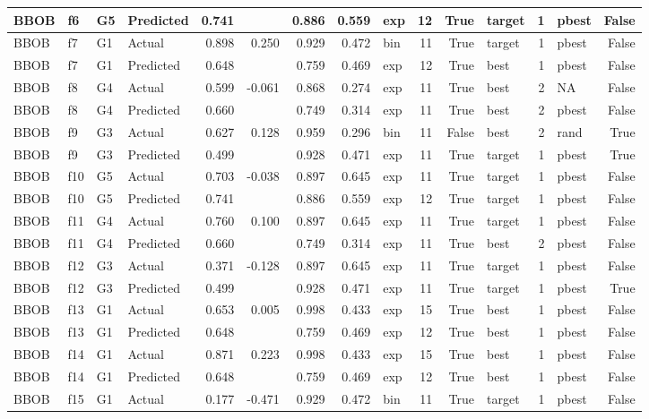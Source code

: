 \begin{table}[htbp]
{\begin{tabular}{llllrrrrlrrlrlr}
BBOB & f6 & G5 & Predicted & 0.741 &  & 0.886 & 0.559 & exp & 12 & True & target & 1 & pbest & False \\
\midrule
BBOB & f7 & G1 & Actual & 0.898 & 0.250 & 0.929 & 0.472 & bin & 11 & True & target & 1 & pbest & False \\
BBOB & f7 & G1 & Predicted & 0.648 &  & 0.759 & 0.469 & exp & 12 & True & best & 1 & pbest & False \\
\midrule
BBOB & f8 & G4 & Actual & 0.599 & -0.061 & 0.868 & 0.274 & exp & 11 & True & best & 2 & NA & False \\
BBOB & f8 & G4 & Predicted & 0.660 &  & 0.749 & 0.314 & exp & 11 & True & best & 2 & pbest & False \\
\midrule
BBOB & f9 & G3 & Actual & 0.627 & 0.128 & 0.959 & 0.296 & bin & 11 & False & best & 2 & rand & True \\
BBOB & f9 & G3 & Predicted & 0.499 &  & 0.928 & 0.471 & exp & 11 & True & target & 1 & pbest & True \\
\midrule
BBOB & f10 & G5 & Actual & 0.703 & -0.038 & 0.897 & 0.645 & exp & 11 & True & target & 1 & pbest & False \\
BBOB & f10 & G5 & Predicted & 0.741 &  & 0.886 & 0.559 & exp & 12 & True & target & 1 & pbest & False \\
\midrule
BBOB & f11 & G4 & Actual & 0.760 & 0.100 & 0.897 & 0.645 & exp & 11 & True & target & 1 & pbest & False \\
BBOB & f11 & G4 & Predicted & 0.660 &  & 0.749 & 0.314 & exp & 11 & True & best & 2 & pbest & False \\
\midrule
BBOB & f12 & G3 & Actual & 0.371 & -0.128 & 0.897 & 0.645 & exp & 11 & True & target & 1 & pbest & False \\
BBOB & f12 & G3 & Predicted & 0.499 &  & 0.928 & 0.471 & exp & 11 & True & target & 1 & pbest & True \\
\midrule
BBOB & f13 & G1 & Actual & 0.653 & 0.005 & 0.998 & 0.433 & exp & 15 & True & best & 1 & pbest & False \\
BBOB & f13 & G1 & Predicted & 0.648 &  & 0.759 & 0.469 & exp & 12 & True & best & 1 & pbest & False \\
\midrule
BBOB & f14 & G1 & Actual & 0.871 & 0.223 & 0.998 & 0.433 & exp & 15 & True & best & 1 & pbest & False \\
BBOB & f14 & G1 & Predicted & 0.648 &  & 0.759 & 0.469 & exp & 12 & True & best & 1 & pbest & False \\
\midrule
BBOB & f15 & G1 & Actual & 0.177 & -0.471 & 0.929 & 0.472 & bin & 11 & True & target & 1 & pbest & False \\

\end{tabular}}
\end{table}

